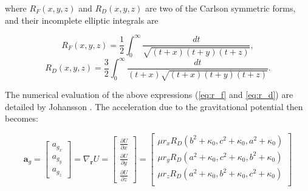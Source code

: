 where $R_F(x, y, z)$ and $R_{D}(x, y, z)$ are two of the Carlson symmetric forms, and their incomplete elliptic integrals are

\begin{equation}
    R_F(x, y, z) = \frac{1}{2}\int_0^\infty\frac{dt}{\sqrt{(t+x)(t+y)(t+z)}},
    \label{eq:r_f}
\end{equation}
\begin{equation}
    R_D(x, y, z) = \frac{3}{2}\int_0^\infty\frac{dt}{(t+x)\sqrt{(t+x)(t+y)(t+z)}}.
    \label{eq:r_d}
\end{equation}

The numerical evaluation of the above expressions (\autoref{eq:r_f} and
\autoref{eq:r_d}) are detailed by Johansson \cite{Johansson2019}. The
acceleration due to the gravitational potential then becomes:

\begin{equation}
    \bm{a}_g
    =
    \begin{bmatrix}
        a_{g_x} \\
        a_{g_y} \\
        a_{g_z}
    \end{bmatrix}
    =
    \nabla_\mathbf{r}{U}
    =
    \begin{bmatrix}
        \frac{\partial{U}}{\partial{x}} \\
        \frac{\partial{U}}{\partial{y}} \\
        \frac{\partial{U}}{\partial{z}}
    \end{bmatrix}
    =
    \begin{bmatrix}
        \mu{r_x}{R_D(b^2 + \kappa_0, c^2 + \kappa_0, a^2 + \kappa_0)} \\
        \mu{r_y}{R_D(a^2 + \kappa_0, c^2 + \kappa_0, b^2 + \kappa_0)} \\
        \mu{r_z}{R_D(a^2 + \kappa_0, b^2 + \kappa_0, c^2 + \kappa_0)} \\
    \end{bmatrix}
\end{equation}


